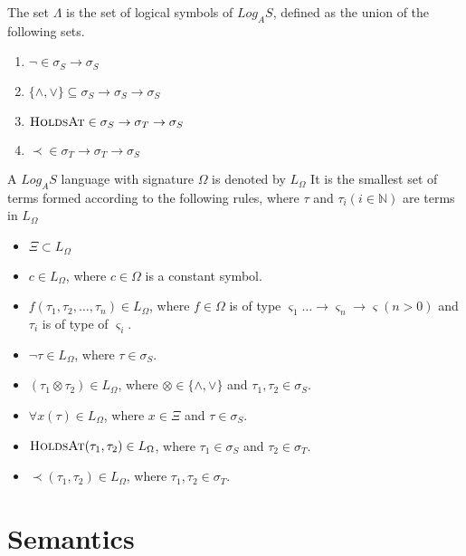 The set $\Lambda$ is the set of logical symbols of $Log_A S$, defined
as the union of the following sets.

\begin{enumerate}
  \item $\neg \in \sigma_S \to \sigma_S$
  \item $\{\land, \lor \} \subseteq \sigma_S \to \sigma_S \to \sigma_S$
  \item $\textsc{HoldsAt} \in \sigma_S \to \sigma_T \to \sigma_S$
  \item $\prec \in \sigma_T \to \sigma_T \to \sigma_S$
\end{enumerate}

A $Log_AS$ language with signature $\Omega$ is denoted by $L_{\Omega}$ It
is the smallest set of terms formed according to the following
rules, where $\tau$ and $\tau_i (i \in \mathbb{N})$ are terms in $L_{\Omega}$

\begin{itemize}
  \item $\Xi \subset L_{\Omega}$
  \item $c \in L_{\Omega}$, where $c \in \Omega$ is a constant symbol.
  \item $f(\tau_1, \tau_2, \dots, \tau_n) \in L_{\Omega}$, where $f \in \Omega$ is of type 
    $\varsigma_1 \dots \to \varsigma_n \to \varsigma  (n > 0)$ and $\tau_i$ is of type of $\varsigma_i$.
  \item $\neg \tau \in L_{\Omega}$, where $\tau \in \sigma_S$.
  \item $(\tau_1 \otimes \tau_2) \in L_{\Omega}$, where $\otimes \in \{\land, \lor\}$ and $\tau_1, \tau_2 \in \sigma_S$.
  \item $\forall x(\tau) \in L_{\Omega}$, where $x \in \Xi$ and $\tau \in \sigma_S$.
  \item $\textsc{HoldsAt}(\tau_1, \tau_2) \in L_{\Omega}$, where $\tau_1 \in \sigma_S$ and $\tau_2 \in \sigma_T$.
  \item $\prec(\tau_1, \tau_2) \in L_{\Omega}$, where $\tau_1, \tau_2 \in \sigma_T$.
\end{itemize}




\section{Semantics}
